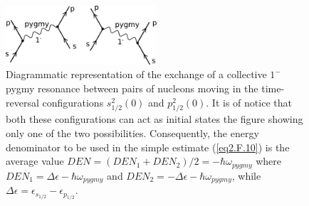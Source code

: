  \begin{figure}
 \centerline{\includegraphics*[width=0.5\textwidth,angle=0]{nutshell/figs/pigmy.pdf}}
 \caption[Exchange of pygmy resonance.]{Diagrammatic representation of the exchange of a collective $1^-$ pygmy resonance between pairs of nucleons moving in the time-reversal configurations $s_{1/2}^2(0)$ and $p_{1/2}^2(0)$. It is of notice that both these configurations can act as initial states  the figure showing only one of the two possibilities. Consequently, the energy denominator to be used in the simple estimate (\ref{eq2.F.10}) is the average value $DEN=(DEN_1+DEN_2)/2=-\hbar\omega_{pygmy}$ where $DEN_1=\Delta \epsilon-\hbar\omega_{pygmy}$ and $DEN_2=-\Delta\epsilon-\hbar\omega_{pygmy}$, while $\Delta\epsilon=\epsilon_{s_{1/2}}-\epsilon_{p_{1/2}}$.}\label{pigmy}
 \end{figure}

